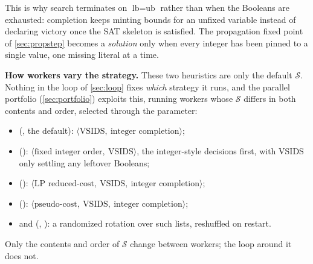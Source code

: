 This is why search terminates on $\text{lb} = \text{ub}$ rather than when the
Booleans are exhausted: completion keeps minting bounds for an unfixed
variable instead of declaring victory once the SAT skeleton is satisfied. The
propagation fixed point of \cref{sec:propstep} becomes a \emph{solution}
only when every integer has been pinned to a single value, one missing literal at
a time.

\textbf{How workers vary the strategy.} These two heuristics are only the default
$\mathcal{S}$. Nothing in the loop of \cref{sec:loop} fixes \emph{which}
strategy it runs, and the parallel portfolio (\cref{sec:portfolio})
exploits this, running workers whose $\mathcal{S}$ differs in both contents and
order, selected through the  parameter:

\begin{itemize}[leftmargin=1.6em,topsep=0.3em,itemsep=0.25em]
  \item {} (, the default):
  $\langle\text{VSIDS},\ \text{integer completion}\rangle$;
  \item {} ():
  $\langle\text{fixed integer order},\ \text{VSIDS}\rangle$, the integer-style
  decisions first, with VSIDS only settling any leftover Booleans;
  \item {} ():
  $\langle\text{LP reduced-cost},\ \text{VSIDS},\ \text{integer completion}\rangle$;
  \item {} ():
  $\langle\text{pseudo-cost},\ \text{VSIDS},\ \text{integer completion}\rangle$;
  \item {} and 
  (, ):
  a randomized rotation over such lists, reshuffled on restart.
\end{itemize}

Only the contents and order of $\mathcal{S}$ change between workers; the loop
around it does not.

